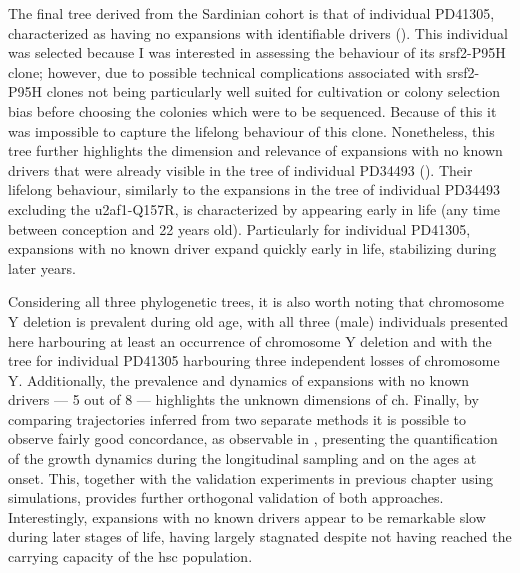 \begin{figure}[!ht]
	\label{fig:tree-pd34493}
\end{figure}

The final tree derived from the Sardinian cohort is that of individual PD41305, characterized as having no expansions with identifiable drivers (). This individual was selected because I was interested in assessing the behaviour of its \ac{srsf2}-P95H clone; however, due to possible technical complications associated with \ac{srsf2}-P95H clones not being particularly well suited for cultivation or colony selection bias before choosing the colonies which were to be sequenced. Because of this it was impossible to capture the lifelong behaviour of this clone. Nonetheless, this tree further highlights the dimension and relevance of expansions with no known drivers that were already visible in the tree of individual PD34493 (). Their lifelong behaviour, similarly to the expansions in the tree of individual PD34493 excluding the \ac{u2af1}-Q157R, is characterized by appearing early in life (any time between conception and 22 years old). Particularly for individual PD41305, expansions with no known driver expand quickly early in life, stabilizing during later years.

\begin{figure}[!ht]
	\label{fig:tree-pd41305}
\end{figure}

Considering all three phylogenetic trees, it is also worth noting that chromosome Y deletion is prevalent during old age, with all three (male) individuals presented here harbouring at least an occurrence of chromosome Y deletion and with the tree for individual PD41305 harbouring three independent losses of chromosome Y. Additionally, the prevalence and dynamics of expansions with no known drivers --- 5 out of 8 --- highlights the unknown dimensions of \ac{ch}. Finally, by comparing trajectories inferred from two separate methods it is possible to observe fairly good concordance, as observable in , presenting the quantification of the growth dynamics during the longitudinal sampling and on the ages at onset. This, together with the validation experiments in previous chapter using simulations, provides further orthogonal validation of both approaches. Interestingly, expansions with no known drivers appear to be remarkable slow during later stages of life, having largely stagnated despite not having reached the carrying capacity of the \ac{hsc} population.

